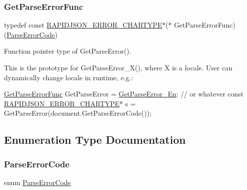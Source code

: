 \subsubsection{\texorpdfstring{Get\+Parse\+Error\+Func}{GetParseErrorFunc}\hspace{0.1cm}{\footnotesize\ttfamily [2/2]}}
{\footnotesize\ttfamily typedef const \hyperlink{group__RAPIDJSON__ERRORS_ga7e4636fd48d0148f102b8a13f0539d8c}{R\+A\+P\+I\+D\+J\+S\+O\+N\+\_\+\+E\+R\+R\+O\+R\+\_\+\+C\+H\+A\+R\+T\+Y\+PE}$\ast$($\ast$ Get\+Parse\+Error\+Func) (\hyperlink{group__RAPIDJSON__ERRORS_ga8d4b32dfc45840bca189ade2bbcb6ba7}{Parse\+Error\+Code})}



Function pointer type of Get\+Parse\+Error(). 

This is the prototype for {\ttfamily Get\+Parse\+Error\+\_\+\+X()}, where {\ttfamily X} is a locale. User can dynamically change locale in runtime, e.\+g.\+: 
\begin{DoxyCode}
\hyperlink{group__RAPIDJSON__ERRORS_ga586548166441ab3ce30219cb35be2e04}{GetParseErrorFunc} GetParseError = \hyperlink{group__RAPIDJSON__ERRORS_ga28835eb93d2c3c07bbea13515eb31415}{GetParseError\_En}; \textcolor{comment}{// or whatever}
\textcolor{keyword}{const} \hyperlink{group__RAPIDJSON__ERRORS_ga7e4636fd48d0148f102b8a13f0539d8c}{RAPIDJSON\_ERROR\_CHARTYPE}* s = GetParseError(document.GetParseErrorCode());
\end{DoxyCode}
 

\subsection{Enumeration Type Documentation}
\mbox{\label{group__RAPIDJSON__ERRORS_ga8d4b32dfc45840bca189ade2bbcb6ba7}} 
\subsubsection{\texorpdfstring{Parse\+Error\+Code}{ParseErrorCode}\hspace{0.1cm}{\footnotesize\ttfamily [1/2]}}
{\footnotesize\ttfamily enum \hyperlink{group__RAPIDJSON__ERRORS_ga8d4b32dfc45840bca189ade2bbcb6ba7}{Parse\+Error\+Code}}



